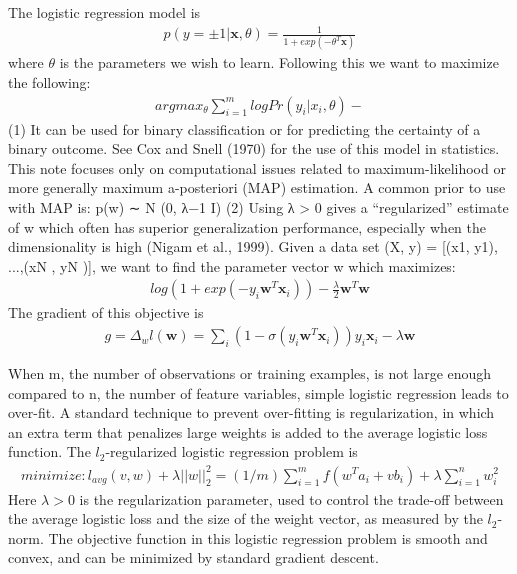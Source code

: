  The logistic regression model is
  \begin{eqnarray} 
 p(y = ±1|\textbf{x}, \theta) = \frac{1}{1 + exp( - \theta^T \textbf{x})}
  \end{eqnarray}
  where $\theta$ is the parameters we wish to learn. Following this we want to maximize the following:
  \begin{eqnarray}
  argmax_\theta \sum_{i=1}^{m} log Pr(y_i | x_i,\theta) - 
    \end{eqnarray}
 (1)
 It can be used for binary classification or for predicting the certainty of a binary outcome. See Cox  and Snell (1970) for the use of this model in statistics. This note focuses only on computational issues related
 to maximum-likelihood or more generally maximum a-posteriori (MAP) estimation. A common
 prior to use with MAP is:
 p(w) ∼ N (0, λ−1  I) (2)
 Using λ > 0 gives a “regularized” estimate of w which often has superior generalization performance,
 especially when the dimensionality is high (Nigam et al., 1999).
 Given a data set (X, y) = [(x1, y1), ...,(xN , yN )], we want to find the parameter vector w which
 maximizes:
 \begin{eqnarray} 
 log(1 + exp(−y_i \textbf{w}^T \textbf{x}_i)) - \frac{\lambda}{2} \textbf{w}^T \textbf{w}
\end{eqnarray}
 The gradient of this objective is
 \begin{eqnarray} 
 g = \Delta_w l (\textbf{w}) = \sum_{i}^{} (1 - \sigma(y_i \textbf{w}^T	\textbf{x}_i)) y_i \textbf{x}_i - \lambda \textbf{w}
\end{eqnarray} 


When m, the number of observations or training examples, is not large enough compared to n, the number of feature variables, simple logistic regression leads to over-fit. A standard technique to prevent over-fitting is regularization, in which an extra term that penalizes large weights is added to the average logistic loss function. The $l_2$-regularized logistic regression problem is
\begin{eqnarray}
minimize:	  l_{avg}(v,w)+ \lambda||w||^2_2 = (1/m) \sum_{i=1}^{m} f(w^T a_i +vb_i) + \lambda \sum_{i=1}^{n} w_i^2
\end{eqnarray}
Here $\lambda > 0$ is the regularization parameter, used to control the trade-off between the average logistic loss and the size of the weight vector, as measured by the $l_2$-norm. The objective function in this logistic regression problem is smooth and convex, and can be minimized by standard gradient descent.


